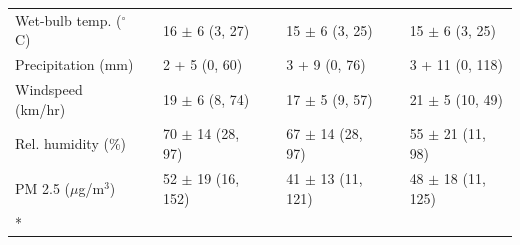 \begin{longtable}[t]{lllllll}
\hspace{1em}Wet-bulb temp. ($^\circ$C) &  & 16 $\pm$ 6 (3, 27) &  & 15 $\pm$ 6 (3, 25) &  & 15 $\pm$ 6 (3, 25)\\
\hspace{1em}Precipitation (mm) &  & 2 + 5 (0, 60) &  & 3 + 9 (0, 76) &  & 3 + 11 (0, 118)\\
\hspace{1em}Windspeed (km/hr) &  & 19 $\pm$ 6 (8, 74) &  & 17 $\pm$ 5 (9, 57) &  & 21 $\pm$ 5 (10, 49)\\
\hspace{1em}Rel. humidity (\%) &  & 70 $\pm$ 14 (28, 97) &  & 67 $\pm$ 14 (28, 97) &  & 55 $\pm$ 21 (11, 98)\\
\hspace{1em}PM 2.5 ($\mu$g/m$^{3}$) &  & 52 $\pm$ 19 (16, 152) &  & 41 $\pm$ 13 (11, 121) &  & 48 $\pm$ 18 (11, 125)\\*
\end{longtable}
\endgroup{}
